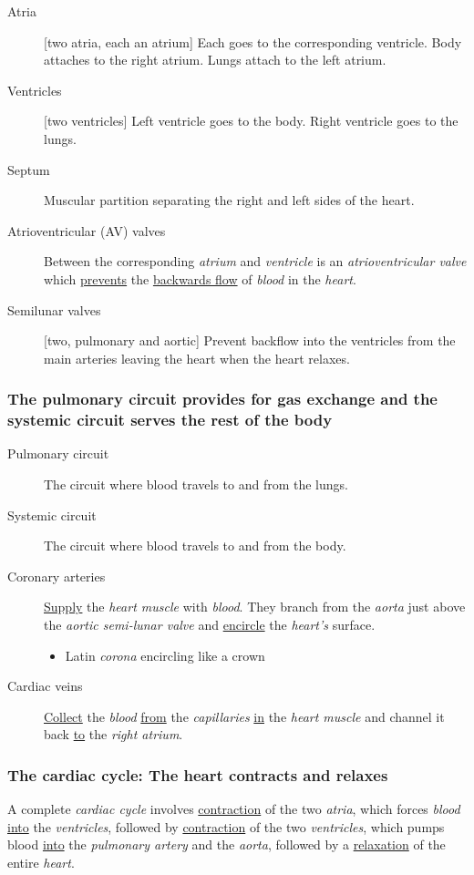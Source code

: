 \documentclass[11pt]{article}
\begin{document}
\begin{description}
\item[{Atria}] [two atria, each an atrium] Each goes to the corresponding
ventricle. Body attaches to the right atrium. Lungs attach to the left
atrium.
\item[{Ventricles}] [two ventricles] Left ventricle goes to the body. Right
ventricle goes to the lungs.
\item[{Septum}] Muscular partition separating the right and left sides of the
heart.
\item[{Atrioventricular (AV) valves}] Between the corresponding \emph{atrium} and
\emph{ventricle} is an \emph{atrioventricular valve} which \uline{prevents} the \uline{backwards
flow} of \emph{blood} in the \emph{heart}.
\item[{Semilunar valves}] [two, pulmonary and aortic] Prevent backflow into the
ventricles from the main arteries leaving the heart when the heart
relaxes.
\end{description}

\subsubsection{The pulmonary circuit provides for gas exchange and the systemic circuit serves the rest of the body}
\label{sec:org651be9c}
\begin{description}
\item[{Pulmonary circuit}] The circuit where blood travels to and from the
lungs.
\item[{Systemic circuit}] The circuit where blood travels to and from the
body.
\item[{Coronary arteries}] \uline{Supply} the \emph{heart muscle} with \emph{blood}. They branch from
the \emph{aorta} just above the \emph{aortic semi-lunar valve} and \uline{encircle} the
\emph{heart's} surface.
\begin{itemize}
\item Latin \emph{corona} encircling like a crown
\end{itemize}
\item[{Cardiac veins}] \uline{Collect} the \emph{blood} \uline{from} the \emph{capillaries} \uline{in} the \emph{heart
muscle} and channel it back \uline{to} the \emph{right atrium}.
\end{description}

\subsubsection{The cardiac cycle: The heart contracts and relaxes}
\label{sec:orgfc5f031}
A complete \emph{cardiac cycle} involves \uline{contraction} of the two \emph{atria}, which forces
\emph{blood} \uline{into} the \emph{ventricles}, followed by \uline{contraction} of the two \emph{ventricles},
which pumps blood \uline{into} the \emph{pulmonary artery} and the \emph{aorta}, followed by a
\uline{relaxation} of the entire \emph{heart}.
\end{document}
